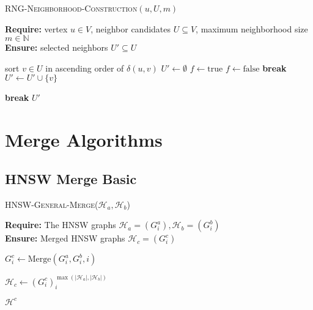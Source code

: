 \documentclass{article}
\begin{document}
\begin{algorithm}
\caption{\textsc{RNG-Neighborhood-Construction}$(u, U, m)$}
\label{alg:rngstrategy}
\textbf{Require:} vertex $u \in V$, neighbor candidates $U \subseteq V$, maximum neighborhood size $m \in \mathbb{N}$\\
\textbf{Ensure:} selected neighbors $U' \subseteq U$
\begin{algorithmic}[1]
    \State sort $v \in U$ in ascending order of $\delta(u,v)$
    \State $U' \gets \emptyset$
        \State $f \gets \text{true}$
                \State $f \gets \text{false}$
                \State \textbf{break}
            \EndIf
        \EndFor
            \State $U' \gets U' \cup \{v\}$
        \EndIf

            \State \textbf{break}
        \EndIf
    \EndFor
    \State \Return $U'$
\end{algorithmic}
\end{algorithm}

\section{Merge Algorithms}

\subsection{HNSW Merge Basic}

\begin{algorithm}
\caption{\textsc{HNSW-General-Merge}($\mathcal{H}_a, \mathcal{H}_b$)}\label{alg:general_merge}
\textbf{Require:} The HNSW graphs $\mathcal{H}_a = (G^a_i), \mathcal{H}_b = (G^b_i)$ \\
\textbf{Ensure:}  Merged HNSW graphs $\mathcal{H}_c = (G^c_i)$ 
\begin{algorithmic}[1]


    \State $G^c_i \gets \text{Merge}(G^a_i, G^b_i, i)$
\EndFor

\State $\mathcal{H}_c \gets (G^c_i)_i^{\max(|\mathcal{H}_a|, |\mathcal{H}_b|)}$

\State \Return $\mathcal{H}^c$
\end{algorithmic}
\end{algorithm}
\end{document}
